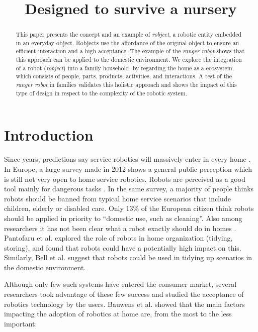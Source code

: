 \documentclass{sig-alternate}
\title{\LARGE \bf
    Designed to survive a nursery
}
\begin{document}
\maketitle

\begin{abstract}

This paper presents the concept and an example of \textit{robject}, a robotic
entity embedded in an everyday object.  Robjects use the affordance of the
original object to ensure an efficient interaction and a high acceptance.  The
example of the \textit{ranger robot} shows that this approach can be applied to
the domestic environment.  We explore the integration of a robot
(\textit{robject}) into a family household, by regarding the home as a
ecosystem, which consists of people, parts, products, activities, and
interactions.  A test of the \textit{ranger robot} in families validates this
holistic approach and shows the impact of this type of design in respect to the
complexity of the robotic system.

\end{abstract}
%
\section{Introduction}
%
Since years, predictions say service robotics will massively enter in every home
\cite{Gates2007}.  In Europe, a large survey made in 2012 shows a general public
perception which is still not very open to home service robotics.  Robots are
perceived as a good tool mainly for dangerous tasks \cite{Eurobarometer2012}.
In the same survey, a majority of people thinks robots should be banned from
typical home service scenarios that include children, elderly or disabled care.
Only 13\% of the European citizen think robots should be applied in priority to
``domestic use, such as cleaning''.  Also among researchers it has not been
clear what a robot exactly should do in homes \cite{Pantofaru2012}.  Pantofaru
et al. \cite{Pantofaru2012} explored the role of robots in home organization
(tidying, storing), and found that robots could have a potentially high impact
on this.  Similarly, Bell et al. \cite{Bell2005} suggest that robots could be
used in tidying up scenarios in the domestic environment.

Although only few such systems have entered the consumer market, several
researchers took advantage of these few success and studied the acceptance of
robotics technology by the users.  Bauwens et al. \cite{Bauwens2012} showed that
the main factors impacting the adoption of robotics at home are, from the most
to the less important:
\end{document}

